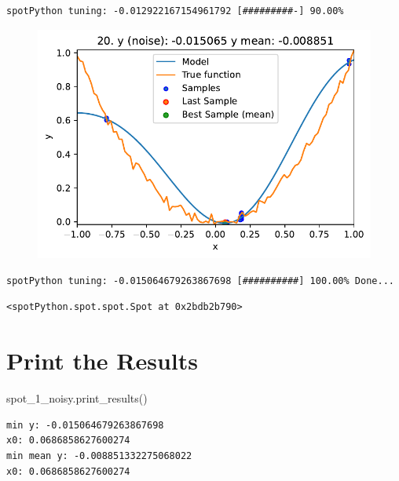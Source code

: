 \documentclass[
  letterpaper,
  DIV=11,
  numbers=noendperiod]{scrreprt}
\newenvironment{Shaded}{\begin{snugshade}}{\end{snugshade}}
\newcommand{\NormalTok}[1]{\textcolor[rgb]{0.00,0.23,0.31}{#1}}
\begin{document}
\begin{verbatim}
spotPython tuning: -0.012922167154961792 [#########-] 90.00% 
\end{verbatim}

\begin{figure}[H]

{\centering \includegraphics{013_num_spot_noisy_files/figure-pdf/cell-6-output-14.pdf}

}

\end{figure}

\begin{verbatim}
spotPython tuning: -0.015064679263867698 [##########] 100.00% Done...
\end{verbatim}

\begin{verbatim}
<spotPython.spot.spot.Spot at 0x2bdb2b790>
\end{verbatim}

\hypertarget{print-the-results-3}{%
\section{Print the Results}\label{print-the-results-3}}

\begin{Shaded}
\begin{Highlighting}[]
\NormalTok{spot\_1\_noisy.print\_results()}
\end{Highlighting}
\end{Shaded}

\begin{verbatim}
min y: -0.015064679263867698
x0: 0.0686858627600274
min mean y: -0.008851332275068022
x0: 0.0686858627600274
\end{verbatim}
\end{document}
